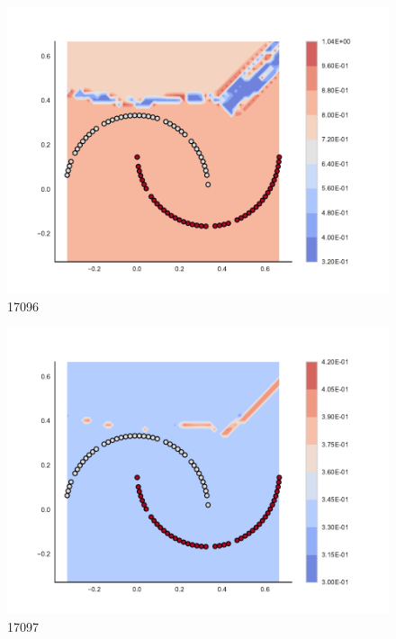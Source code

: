 \begin{subfigure}[b]{0.09\textwidth}
    \includegraphics[clip, trim=2.35cm 1.75cm 4.5cm 0cm,width=\textwidth]{img/convergence/17096.pdf}
    \caption{17096}
    \label{fig:convergence_17096}
\end{subfigure}
%
\begin{subfigure}[b]{0.09\textwidth}
    \includegraphics[clip, trim=2.35cm 1.75cm 4.5cm 0cm,width=\textwidth]{img/convergence/17097.pdf}
    \caption{17097}
    \label{fig:convergence_17097}
\end{subfigure}
%